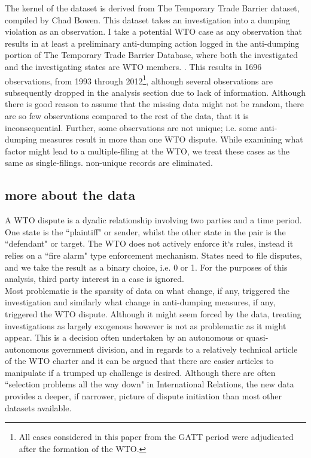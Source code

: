 \documentclass[]{article}
\begin{document}
The kernel of the dataset is derived from The Temporary Trade Barrier dataset, compiled by Chad Bowen. This dataset takes an investigation into a dumping violation as an observation. I take a potential WTO case as any observation that results in at least a preliminary anti-dumping action logged in the anti-dumping portion of The Temporary Trade Barrier Database, where both the investigated and the investigating states are WTO members. \cite{BADD}. This results in 1696 observations, from 1993 through 2012\footnote{All cases considered in this paper from the GATT period were adjudicated after the formation of the WTO.}, although several observations are subsequently dropped in the analysis section due to lack of information. Although there is good reason to assume that the missing data might not be random, there are so few observations compared to the rest of the data, that it is inconsequential. Further, some observations are not unique; i.e. some anti-dumping measures result in more than one WTO dispute. While examining what factor might lead to a multiple-filing at the WTO, we treat these cases as the same as single-filings. non-unique records are eliminated. 

\subsection{more about the data}
A WTO dispute is a dyadic relationship involving two parties and a time period. One state is the ``plaintiff" or sender, whilst the other state in the pair is the ``defendant" or target. The WTO does not actively enforce it`s rules, instead it relies on a ``fire alarm" type enforcement mechanism. States need to file disputes, and we take the result as a binary choice, i.e. 0 or 1. For the purposes of this analysis, third party interest in a case is ignored.  \\

Most problematic is the sparsity of data on what change, if any, triggered the investigation and similarly what change in anti-dumping measures, if any, triggered the WTO dispute. Although it might seem forced by the data, treating investigations as largely exogenous however is not as problematic as it might appear. This is a decision often undertaken by an autonomous or quasi-autonomous government division, and in regards to a relatively technical article of the WTO charter and it can be argued that there are easier articles to manipulate if a trumped up challenge is desired.  Although there are often ``selection problems all the way down" in International Relations, the new data provides a deeper, if narrower, picture of dispute initiation than most other datasets available. 
\end{document}
